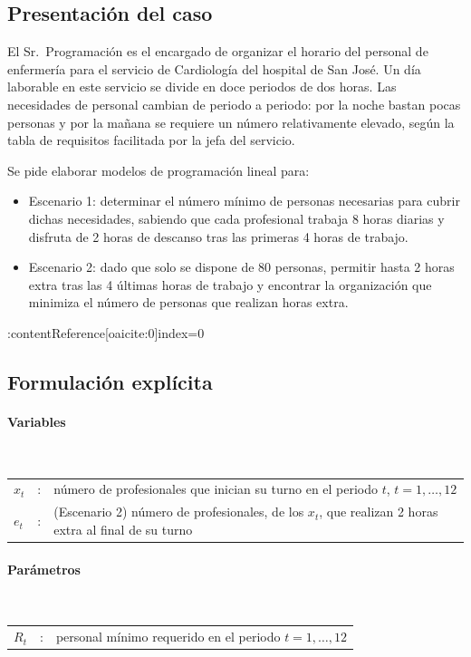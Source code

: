 \subsection{Presentación del caso}
El Sr.\ Programación es el encargado de organizar el horario del personal de enfermería para el servicio de Cardiología del hospital de San José. Un día laborable en este servicio se divide en doce periodos de dos horas. Las necesidades de personal cambian de periodo a periodo: por la noche bastan pocas personas y por la mañana se requiere un número relativamente elevado, según la tabla de requisitos facilitada por la jefa del servicio. 

\noindent Se pide elaborar modelos de programación lineal para: 

\begin{itemize}
    \item Escenario 1: determinar el número mínimo de personas necesarias para cubrir dichas necesidades, sabiendo que cada profesional trabaja 8 horas diarias y disfruta de 2 horas de descanso tras las primeras 4 horas de trabajo.
    \item Escenario 2: dado que solo se dispone de 80 personas, permitir hasta 2 horas extra tras las 4 últimas horas de trabajo y encontrar la organización que minimiza el número de personas que realizan horas extra.
\end{itemize}:contentReference[oaicite:0]{index=0}

\subsection{Formulación explícita}

\paragraph{Variables}\mbox{}\\
\begin{tabular}{l c l}
    $x_t$  & : & número de profesionales que inician su turno en el periodo $t$, $t=1,\dots,12$\\
    $e_t$  & : & (Escenario 2) número de profesionales, de los $x_t$, que realizan 2 horas extra al final de su turno\\
\end{tabular}

\paragraph{Parámetros}\mbox{}\\
\begin{tabular}{l c l}
    $R_t$  & : & personal mínimo requerido en el periodo $t=1,\dots,12$\\
\end{tabular}

